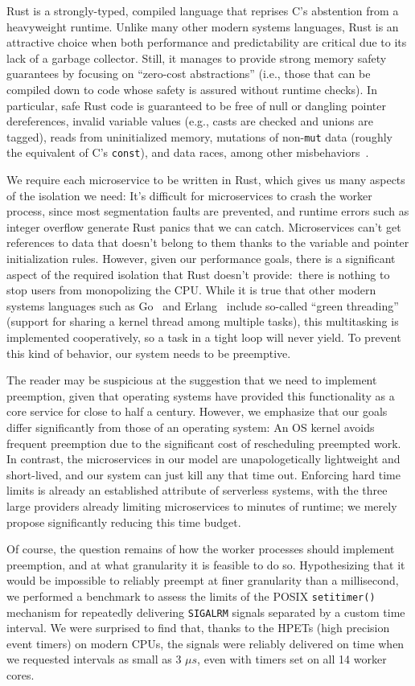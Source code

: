 Rust is a strongly-typed, compiled language that reprises C's abstention from a
heavyweight runtime.  Unlike many other modern systems languages, Rust is an
attractive choice when both performance and predictability are critical due to its
lack of a garbage collector.  Still, it manages to provide strong memory safety
guarantees by focusing on ``zero-cost abstractions'' (i.e., those that can be
compiled down to code whose safety is assured without runtime checks).  In
particular, safe Rust code is guaranteed to be free of null or dangling pointer
dereferences, invalid variable values (e.g., casts are checked and unions are
tagged), reads from uninitialized memory, mutations of non-\texttt{mut} data (roughly
the equivalent of C's \texttt{const}), and data races, among other
misbehaviors~\cite{www-rustlang-ub}.

We require each microservice to be written in Rust, which gives us many aspects of
the isolation we need:  It's difficult for microservices to crash the worker process,
since most segmentation faults are prevented, and runtime errors such as integer
overflow generate Rust panics that we can catch.  Microservices can't get references
to data that doesn't belong to them thanks to the variable and pointer initialization
rules.  However, given our performance goals, there is a significant aspect of the
required isolation that Rust doesn't provide:\ there is nothing to stop users from
monopolizing the CPU.  While it is true that other modern systems languages such as
Go~\cite{www-golang} and Erlang~\cite{www-erlang} include so-called ``green
threading'' (support for sharing a kernel thread among multiple tasks), this
multitasking is implemented cooperatively, so a task in a tight loop will never
yield.  To prevent this kind of behavior, our system needs to be preemptive.

The reader may be suspicious at the suggestion that we need to implement preemption,
given that operating systems have provided this functionality as a core service for
close to half a century.  However, we emphasize that our goals differ significantly
from those of an operating system:  An OS kernel avoids frequent preemption due to
the significant cost of rescheduling preempted work.  In contrast, the microservices
in our model are unapologetically lightweight and short-lived, and our system can
just kill any that time out.  Enforcing hard time limits is already an established
attribute of serverless systems, with the three large providers already limiting
microservices to minutes of runtime; we merely propose significantly reducing this
time budget.

Of course, the question remains of how the worker processes should implement
preemption, and at what granularity it is feasible to do so.  Hypothesizing that it
would be impossible to reliably preempt at finer granularity than a millisecond, we
performed a benchmark to assess the limits of the POSIX \texttt{setitimer()}
mechanism for repeatedly delivering \texttt{SIGALRM} signals separated by a custom
time interval.  We were surprised to find that, thanks to the HPETs (high precision
event timers) on modern CPUs, the signals were reliably delivered on time when we
requested intervals as small as 3 $\mu{}s$, even with timers set on all 14 worker
cores.
